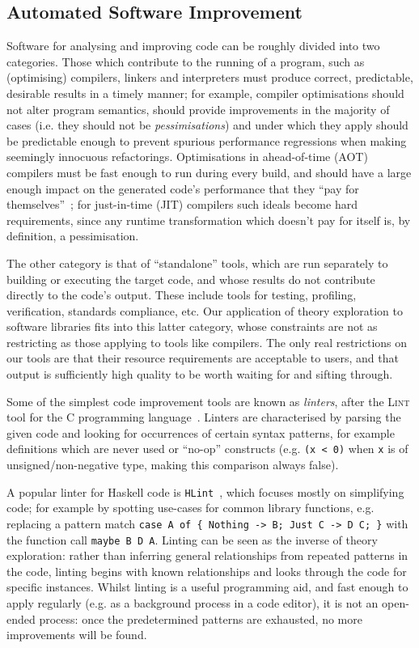 \subsection{Automated Software Improvement}

Software for analysing and improving code can be roughly divided into two
categories. Those which contribute to the running of a program, such as
(optimising) compilers, linkers and interpreters must produce correct,
predictable, desirable results in a timely manner; for example, compiler
optimisations should not alter program semantics, should provide improvements in
the majority of cases (i.e. they should not be \emph{pessimisations}) and under
which they apply should be predictable enough to prevent spurious performance
regressions when making seemingly innocuous refactorings. Optimisations in
ahead-of-time (AOT) compilers must be fast enough to run during every build, and
should have a large enough impact on the generated code's performance that they
``pay for themselves''~\cite{Franz1994}; for just-in-time (JIT) compilers such
ideals become hard requirements, since any runtime transformation which doesn't
pay for itself is, by definition, a pessimisation.

The other category is that of ``standalone'' tools, which are run separately to
building or executing the target code, and whose results do not contribute
directly to the code's output. These include tools for testing, profiling,
verification, standards compliance, etc. Our application of theory exploration
to software libraries fits into this latter category, whose constraints are not
as restricting as those applying to tools like compilers. The only real
restrictions on our tools are that their resource requirements are acceptable to
users, and that output is sufficiently high quality to be worth waiting for and
sifting through.

Some of the simplest code improvement tools are known as \emph{linters}, after
the \textsc{Lint} tool for the C programming language~\cite{Johnson78lint}.
Linters are characterised by parsing the given code and looking for occurrences
of certain syntax patterns, for example definitions which are never used or
``no-op'' constructs (e.g. \texttt{(x < 0)} when \texttt{x} is of
unsigned/non-negative type, making this comparison always false).

A popular linter for Haskell code is \texttt{HLint}~\cite{mitchell2014hlint},
which focuses mostly on simplifying code; for example by spotting use-cases for
common library functions, e.g. replacing a pattern match \texttt{case A of \{
  Nothing -> B; Just C -> D C; \}} with the function call \texttt{maybe B D A}.
Linting can be seen as the inverse of theory exploration: rather than inferring
general relationships from repeated patterns in the code, linting begins with
known relationships and looks through the code for specific instances. Whilst
linting is a useful programming aid, and fast enough to apply regularly (e.g. as
a background process in a code editor), it is not an open-ended process: once
the predetermined patterns are exhausted, no more improvements will be found.

